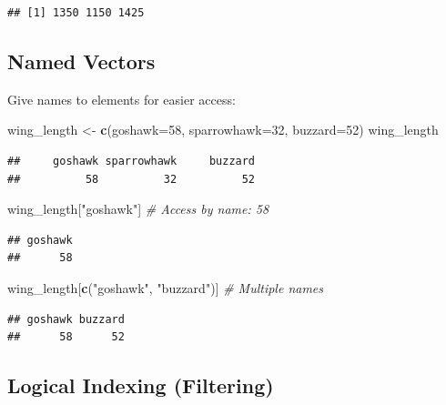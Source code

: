 \documentclass[
]{article}
\newenvironment{Shaded}{\begin{snugshade}}{\end{snugshade}}
\newcommand{\AttributeTok}[1]{\textcolor[rgb]{0.13,0.29,0.53}{#1}}
\newcommand{\CommentTok}[1]{\textcolor[rgb]{0.56,0.35,0.01}{\textit{#1}}}
\newcommand{\DecValTok}[1]{\textcolor[rgb]{0.00,0.00,0.81}{#1}}
\newcommand{\FunctionTok}[1]{\textcolor[rgb]{0.13,0.29,0.53}{\textbf{#1}}}
\newcommand{\NormalTok}[1]{#1}
\newcommand{\OtherTok}[1]{\textcolor[rgb]{0.56,0.35,0.01}{#1}}
\newcommand{\StringTok}[1]{\textcolor[rgb]{0.31,0.60,0.02}{#1}}
\begin{document}
\begin{verbatim}
## [1] 1350 1150 1425
\end{verbatim}

\subsection{Named Vectors}\label{named-vectors}

Give names to elements for easier access:

\begin{Shaded}
\begin{Highlighting}[]
\NormalTok{wing\_length }\OtherTok{\textless{}{-}} \FunctionTok{c}\NormalTok{(}\AttributeTok{goshawk=}\DecValTok{58}\NormalTok{, }\AttributeTok{sparrowhawk=}\DecValTok{32}\NormalTok{, }\AttributeTok{buzzard=}\DecValTok{52}\NormalTok{)}
\NormalTok{wing\_length}
\end{Highlighting}
\end{Shaded}

\begin{verbatim}
##     goshawk sparrowhawk     buzzard 
##          58          32          52
\end{verbatim}

\begin{Shaded}
\begin{Highlighting}[]
\NormalTok{wing\_length[}\StringTok{"goshawk"}\NormalTok{]              }\CommentTok{\# Access by name: 58}
\end{Highlighting}
\end{Shaded}

\begin{verbatim}
## goshawk 
##      58
\end{verbatim}

\begin{Shaded}
\begin{Highlighting}[]
\NormalTok{wing\_length[}\FunctionTok{c}\NormalTok{(}\StringTok{"goshawk"}\NormalTok{, }\StringTok{"buzzard"}\NormalTok{)] }\CommentTok{\# Multiple names}
\end{Highlighting}
\end{Shaded}

\begin{verbatim}
## goshawk buzzard 
##      58      52
\end{verbatim}

\subsection{Logical Indexing
(Filtering)}\label{logical-indexing-filtering}
\end{document}
